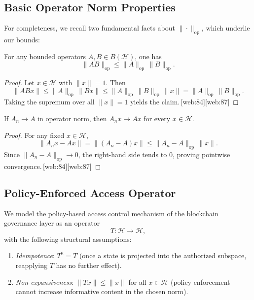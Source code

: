 \documentclass[11pt]{article}
\begin{document}
\subsection{Basic Operator Norm Properties}

For completeness, we recall two fundamental facts about $\|\cdot\|_{\mathrm{op}}$, which underlie our bounds:

\begin{lemma}[Submultiplicativity]
\label{lem:submult}
For any bounded operators $A, B \in B(\mathcal{H})$, one has
\[
  \|A B\|_{\mathrm{op}} \le \|A\|_{\mathrm{op}} \, \|B\|_{\mathrm{op}}.
\]
\end{lemma}

\begin{proof}
Let $x \in \mathcal{H}$ with $\|x\| = 1$. 
Then
\[
  \|A B x\| \le \|A\|_{\mathrm{op}} \, \|B x\| \le \|A\|_{\mathrm{op}} \, \|B\|_{\mathrm{op}} \, \|x\|
  = \|A\|_{\mathrm{op}} \, \|B\|_{\mathrm{op}}.
\]
Taking the supremum over all $\|x\| = 1$ yields the claim.\,[web:84][web:87]
\end{proof}

\begin{lemma}[Continuity]
\label{lem:cont}
If $A_n \to A$ in operator norm, then $A_n x \to A x$ for every $x \in \mathcal{H}$.
\end{lemma}

\begin{proof}
For any fixed $x \in \mathcal{H}$,
\[
  \|A_n x - A x\| = \|(A_n - A) x\|
  \le \|A_n - A\|_{\mathrm{op}} \, \|x\|.
\]
Since $\|A_n - A\|_{\mathrm{op}} \to 0$, the right-hand side tends to $0$, proving pointwise convergence.\,[web:84][web:87]
\end{proof}

\subsection{Policy-Enforced Access Operator}

We model the policy-based access control mechanism of the blockchain governance layer as an operator
\[
  T : \mathcal{H} \to \mathcal{H},
\]
with the following structural assumptions:

\begin{enumerate}[label=(T\arabic*), nosep]
  \item \emph{Idempotence}: $T^2 = T$ (once a state is projected into the authorized subspace, reapplying $T$ has no further effect).
  \item \emph{Non-expansiveness}: $\|T x\| \le \|x\|$ for all $x \in \mathcal{H}$ (policy enforcement cannot increase informative content in the chosen norm).
\end{enumerate}
\end{document}
